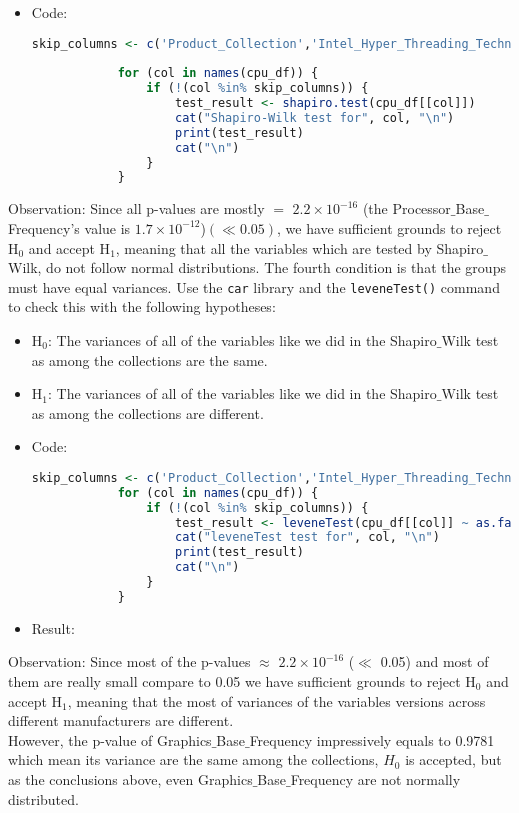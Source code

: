 \documentclass{article}
\begin{document}
	
	\begin{itemize}
		\item Code:
		\begin{lstlisting}[language=R]
			skip_columns <- c('Product_Collection','Intel_Hyper_Threading_Technology_')
			
			for (col in names(cpu_df)) {
				if (!(col %in% skip_columns)) {
					test_result <- shapiro.test(cpu_df[[col]])
					cat("Shapiro-Wilk test for", col, "\n")
					print(test_result)
					cat("\n")
				}
			}
		\end{lstlisting}    
	\end{itemize}
	Observation: Since all p-values are mostly $=$ $2.2 \times 10^{-16}$  (the Processor$\_$Base$\_$Frequency's value is $1.7 \times 10^{-12}$)$(\ll 0.05)$, we have sufficient grounds to reject H$_0$ and accept H$_1$, meaning that all the variables which are tested by Shapiro$\_$Wilk, do not follow normal distributions.
	The fourth condition is that the groups must have equal variances. Use the \texttt{car} library and the \texttt{leveneTest()} command to check this with the following hypotheses:
	\begin{itemize}
		\item H$_0$: The variances of all of the variables like we did in the Shapiro$\_$Wilk test as among the collections are the same.
		\item H$_1$: The variances of all of the variables like we did in the Shapiro$\_$Wilk test as among the collections are different.
	\end{itemize}
	
	\begin{itemize}
		\item Code:
		\begin{lstlisting}[language=R]
			skip_columns <- c('Product_Collection','Intel_Hyper_Threading_Technology_')
			for (col in names(cpu_df)) {
				if (!(col %in% skip_columns)) {
					test_result <- leveneTest(cpu_df[[col]] ~ as.factor(cpu_df $Product_Collection ))
					cat("leveneTest test for", col, "\n")
					print(test_result)
					cat("\n")
				}
			}
		\end{lstlisting}
		
		\item Result:
	\end{itemize}
	Observation: Since most of the p-values $\approx$ $2.2 \times 10^{-16}$ ($\ll$ 0.05) and most of them are really small compare to 0.05 we have sufficient grounds to reject H$_0$ and accept H$_1$, meaning that the most of variances of the variables versions across different manufacturers are different.
	\\ However, the p-value of Graphics$\_$Base$\_$Frequency impressively equals to 0.9781 which mean its variance are the same among the collections, $H_0$ is accepted, but as the conclusions above, even Graphics$\_$Base$\_$Frequency are not normally distributed.
	
\end{document}
